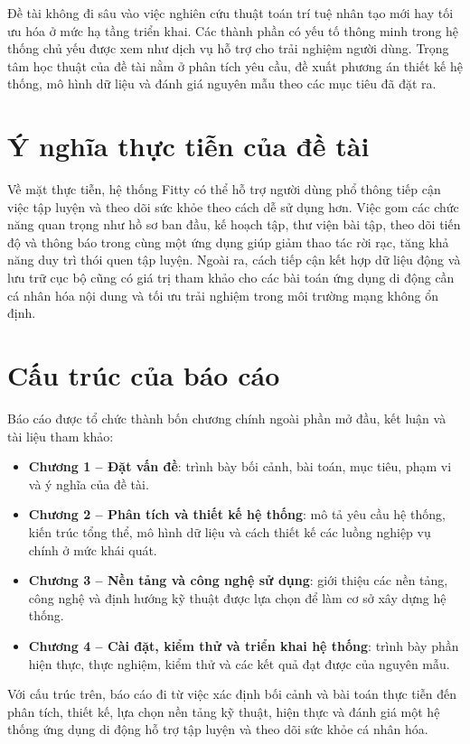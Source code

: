 Đề tài không đi sâu vào việc nghiên cứu thuật toán trí tuệ nhân tạo mới hay tối ưu hóa ở mức hạ tầng triển khai. Các thành phần có yếu tố thông minh trong hệ thống chủ yếu được xem như dịch vụ hỗ trợ cho trải nghiệm người dùng. Trọng tâm học thuật của đề tài nằm ở phân tích yêu cầu, đề xuất phương án thiết kế hệ thống, mô hình dữ liệu và đánh giá nguyên mẫu theo các mục tiêu đã đặt ra.

\section{Ý nghĩa thực tiễn của đề tài}

Về mặt thực tiễn, hệ thống Fitty có thể hỗ trợ người dùng phổ thông tiếp cận việc tập luyện và theo dõi sức khỏe theo cách dễ sử dụng hơn. Việc gom các chức năng quan trọng như hồ sơ ban đầu, kế hoạch tập, thư viện bài tập, theo dõi tiến độ và thông báo trong cùng một ứng dụng giúp giảm thao tác rời rạc, tăng khả năng duy trì thói quen tập luyện. Ngoài ra, cách tiếp cận kết hợp dữ liệu động và lưu trữ cục bộ cũng có giá trị tham khảo cho các bài toán ứng dụng di động cần cá nhân hóa nội dung và tối ưu trải nghiệm trong môi trường mạng không ổn định.

\section{Cấu trúc của báo cáo}

Báo cáo được tổ chức thành bốn chương chính ngoài phần mở đầu, kết luận và tài liệu tham khảo:

\begin{itemize}
    \item \textbf{Chương 1 -- Đặt vấn đề}: trình bày bối cảnh, bài toán, mục tiêu, phạm vi và ý nghĩa của đề tài.
    \item \textbf{Chương 2 -- Phân tích và thiết kế hệ thống}: mô tả yêu cầu hệ thống, kiến trúc tổng thể, mô hình dữ liệu và cách thiết kế các luồng nghiệp vụ chính ở mức khái quát.
    \item \textbf{Chương 3 -- Nền tảng và công nghệ sử dụng}: giới thiệu các nền tảng, công nghệ và định hướng kỹ thuật được lựa chọn để làm cơ sở xây dựng hệ thống.
    \item \textbf{Chương 4 -- Cài đặt, kiểm thử và triển khai hệ thống}: trình bày phần hiện thực, thực nghiệm, kiểm thử và các kết quả đạt được của nguyên mẫu.
\end{itemize}

Với cấu trúc trên, báo cáo đi từ việc xác định bối cảnh và bài toán thực tiễn đến phân tích, thiết kế, lựa chọn nền tảng kỹ thuật, hiện thực và đánh giá một hệ thống ứng dụng di động hỗ trợ tập luyện và theo dõi sức khỏe cá nhân hóa.

